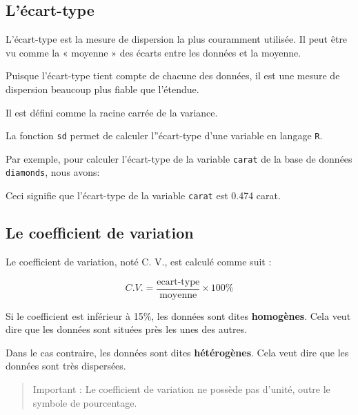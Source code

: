 \documentclass[]{book}
\newenvironment{Shaded}{\begin{snugshade}}{\end{snugshade}}
\newcommand{\KeywordTok}[1]{\textcolor[rgb]{0.13,0.29,0.53}{\textbf{#1}}}
\newcommand{\NormalTok}[1]{#1}
\newcommand{\OperatorTok}[1]{\textcolor[rgb]{0.81,0.36,0.00}{\textbf{#1}}}
\theoremstyle{definition}
\theoremstyle{definition}
\theoremstyle{definition}
\theoremstyle{remark}
\begin{document}
\hypertarget{lecart-type}{%
\subsection{L'écart-type}\label{lecart-type}}

L'écart-type est la mesure de dispersion la plus couramment utilisée. Il
peut être vu comme la « moyenne » des écarts entre les données et la
moyenne.

Puisque l'écart-type tient compte de chacune des données, il est une
mesure de dispersion beaucoup plus fiable que l'étendue.

Il est défini comme la racine carrée de la variance.

La fonction \texttt{sd} permet de calculer l''écart-type d'une variable
en langage \texttt{R}.

Par exemple, pour calculer l'écart-type de la variable \texttt{carat} de
la base de données \texttt{diamonds}, nous avons:

\begin{Shaded}
\end{Shaded}

Ceci signifie que l'écart-type de la variable \texttt{carat} est 0.474
carat.

\hypertarget{le-coefficient-de-variation}{%
\subsection{Le coefficient de
variation}\label{le-coefficient-de-variation}}

Le coefficient de variation, noté C. V., est calculé comme suit :

\begin{equation}
C.V. = \dfrac{\text{ecart-type}}{\text{moyenne}}\times 100\%
\end{equation}

Si le coefficient est inférieur à 15\%, les données sont dites
\textbf{homogènes}. Cela veut dire que les données sont situées près les
unes des autres.

Dans le cas contraire, les données sont dites \textbf{hétérogènes}. Cela
veut dire que les données sont très dispersées.

\begin{quote}
Important : Le coefficient de variation ne possède pas d'unité, outre le
symbole de pourcentage.
\end{quote}
\end{document}
